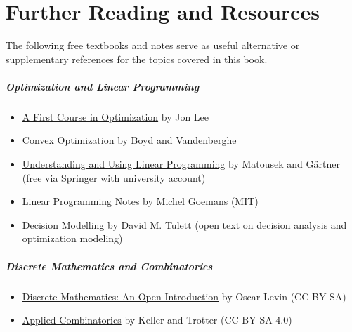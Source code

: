 
\chapter{Further Reading and Resources}

The following free textbooks and notes serve as useful alternative or supplementary references for the topics covered in this book.

\paragraph{\textbf{Optimization and Linear Programming}}
\begin{itemize}
\item \href{http://www.optimization-online.org/DB_FILE/2013/12/4161.pdf}{A First Course in Optimization} by Jon Lee
\item \href{https://web.stanford.edu/~boyd/cvxbook/}{Convex Optimization} by Boyd and Vandenberghe
\item \href{https://www.springer.com/gp/book/9783540306979}{Understanding and Using Linear Programming} by Matousek and G\"artner (free via Springer with university account)
\item \href{http://math.mit.edu/~goemans/18310S15/lpnotes310.pdf}{Linear Programming Notes} by Michel Goemans (MIT)
\item \href{https://www.researchgate.net/publication/411022416_Decision_Modelling}{Decision Modelling} by David M. Tulett (open text on decision analysis and optimization modeling)
\end{itemize}

\paragraph{\textbf{Discrete Mathematics and Combinatorics}}
\begin{itemize}
\item \href{http://discrete.openmathbooks.org/dmoi3.html}{Discrete Mathematics: An Open Introduction} by Oscar Levin (CC-BY-SA)
\item \href{http://www.rellek.net/book/frontmatter-1.html}{Applied Combinatorics} by Keller and Trotter (CC-BY-SA 4.0)
\end{itemize}

